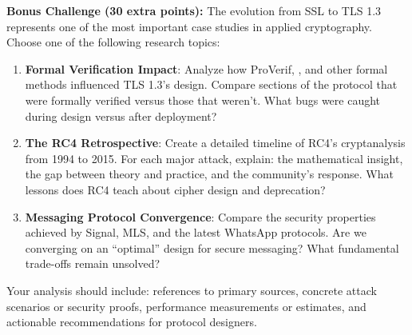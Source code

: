 \documentclass[10pt,a4paper,american]{exam}
\begin{document}
\begin{tcolorbox}[colframe=EarthBrown!30!white,colback=EarthBrown!5!white]
	\textbf{Bonus Challenge (30 extra points):} The evolution from SSL to TLS 1.3 represents one of the most important case studies in applied cryptography. Choose one of the following research topics:
	\begin{enumerate}
		\item \textbf{Formal Verification Impact}: Analyze how ProVerif, \fstar, and other formal methods influenced TLS 1.3's design. Compare sections of the protocol that were formally verified versus those that weren't. What bugs were caught during design versus after deployment?
		\item \textbf{The RC4 Retrospective}: Create a detailed timeline of RC4's cryptanalysis from 1994 to 2015. For each major attack, explain: the mathematical insight, the gap between theory and practice, and the community's response. What lessons does RC4 teach about cipher design and deprecation?
		\item \textbf{Messaging Protocol Convergence}: Compare the security properties achieved by Signal, MLS, and the latest WhatsApp protocols. Are we converging on an ``optimal'' design for secure messaging? What fundamental trade-offs remain unsolved?
	\end{enumerate}
	Your analysis should include: references to primary sources, concrete attack scenarios or security proofs, performance measurements or estimates, and actionable recommendations for protocol designers.
\end{tcolorbox}
\end{document}

